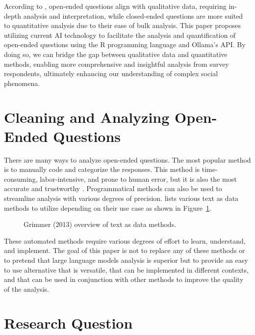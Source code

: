 \documentclass[
  authoryear,
  preprint,
  3p]{elsarticle}
\begin{document}
According to \citet{bickman_rog09}, open-ended questions align with
qualitative data, requiring in-depth analysis and interpretation, while
closed-ended questions are more suited to quantitative analysis due to
their ease of bulk analysis. This paper proposes utilizing current AI
technology to facilitate the analysis and quantification of open-ended
questions using the R programming language and Ollama's API. By doing
so, we can bridge the gap between qualitative data and quantitative
methods, enabling more comprehensive and insightful analysis from survey
respondents, ultimately enhancing our understanding of complex social
phenomena.

\section{Cleaning and Analyzing Open-Ended
Questions}\label{cleaning-and-analyzing-open-ended-questions}

There are many ways to analyze open-ended questions. The most popular
method is to manually code and categorize the responses. This method is
time-consuming, labor-intensive, and prone to human error, but it is
also the most accurate and trustworthy \citep{roberts_etal14}.
Programmatical methods can also be used to streamline analysis with
various degrees of precision. \citet{grimmer_etal13} lists various text
as data methods to utilize depending on their use case as shown in
Figure~\ref{fig-methods}.

\begin{figure}


\caption{\label{fig-methods}Grimmer (2013) overview of text as data
methods.}

\end{figure}%

These automated methods require various degrees of effort to learn,
understand, and implement. The goal of this paper is not to replace any
of these methods or to pretend that large language models analysis is
superior but to provide an easy to use alternative that is versatile,
that can be implemented in different contexts, and that can be used in
conjunction with other methods to improve the quality of the analysis.

\section{Research Question}\label{research-question}
\end{document}
